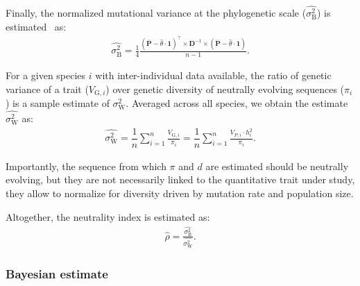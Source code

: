 \documentclass{article}
\newcommand{\Multiply}{\cdot}
\newcommand{\MultiplyMatrix}{\times}
\newcommand{\UniDimArray}[1]{\bm{#1}}
\newcommand{\BiDimArray}[1]{\bm{#1}}
\newcommand{\tr}{^{\intercal}}
\newcommand{\inv}{^{-1}}
\newcommand{\Spi}{i}
\newcommand{\NbrTaxa}{n}
\newcommand{\Trait}{P}
\newcommand{\Heredity}{h^2}
\newcommand{\VecTrait}{\UniDimArray{\bar{\Trait}}}
\newcommand{\RootTrait}{\widehat{\theta}}
\newcommand{\VecOne}{\UniDimArray{1}}
\newcommand{\Distance}{\BiDimArray{D}}
\newcommand{\DistanceMatrix}{\BiDimArray{\Distance}}
\newcommand{\VarGeneticSpi}{V_{\mathrm{G}, \Spi}}
\newcommand{\RatePhy}{\sigma^2_{\mathrm{B}}}
\newcommand{\RatePop}{\sigma^2_{\mathrm{W}}}
\newcommand{\EstRatePhy}{\widehat{\RatePhy}}
\newcommand{\EstRatePop}{\widehat{\RatePop}}
\newcommand{\EstNI}{\widehat{\rho}}
\begin{document}
Finally, the normalized mutational variance at the phylogenetic scale ($\EstRatePhy$) is estimated~\cite{omeara_testing_2006} as:
\begin{gather}
    \EstRatePhy = \frac{1}{4}\frac{\left( \VecTrait -  \RootTrait \Multiply \VecOne \right)\tr \MultiplyMatrix \DistanceMatrix\inv \MultiplyMatrix \left( \VecTrait -  \RootTrait \Multiply \VecOne  \right)}{\NbrTaxa - 1}. \label{eq:estimated-rate-phy}
\end{gather}

For a given species $\Spi$ with inter-individual data available, the ratio of genetic variance of a trait ($\VarGeneticSpi$) over genetic diversity of neutrally evolving sequences ($\pi_{\Spi}$) is a sample estimate of $\RatePop$.
Averaged across all species, we obtain the estimate $\EstRatePop$ as:
\begin{gather}
    \EstRatePop = \dfrac{1}{\NbrTaxa}\sum_{i=1}^{\NbrTaxa}\frac{  \VarGeneticSpi}{ \pi_{i}} = \dfrac{1}{\NbrTaxa}\sum_{i=1}^{\NbrTaxa} \frac{  V_{\Trait, i} \Multiply \Heredity_{i}}{ \pi_{i}}. \label{eq:estimated-rate-pop}
\end{gather}

Importantly, the sequence from which $\pi$ and $d$ are estimated should be neutrally evolving, but they are not necessarily linked to the quantitative trait under study, they allow to normalize for diversity driven by mutation rate and population size.

Altogether, the neutrality index is estimated as:
\begin{gather}
    \EstNI = \frac{\EstRatePhy}{\EstRatePop}. \label{eq:estimated-NI}
\end{gather}

\subsubsection*{Bayesian estimate}
\end{document}
